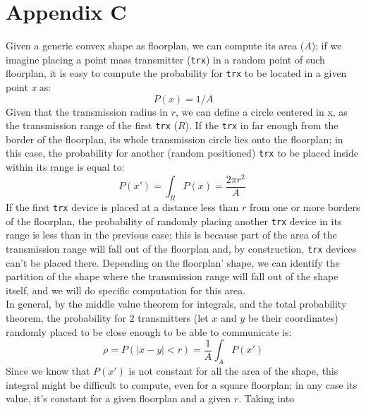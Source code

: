 \section*{Appendix C}
\label{app:c}
Given a generic convex shape as floorplan, we can compute its area ($A$); if we
imagine placing a point mass transmitter (\texttt{trx}) in a random point of
such floorplan, it is easy to compute the probability for \texttt{trx} to be
located in a given point \textit{x} as:
\begin{equation*}
    P(x) = 1/A
\end{equation*}
Given that the transmission radius in $r$, we can define a circle centered in x, 
as the transmission range of the first \texttt{trx} ($R$). If the \texttt{trx}
in far enough from the border of the floorplan, its whole transmission circle lies
onto the floorplan; in this case, the probability for another (random
positioned) \texttt{trx} to be placed inside within its range is equal to:
\begin{equation*}
    P(x') = \int_{R}^{} P(x)= \frac{2\pi r^2}{A} \ 
\end{equation*}
If the first \texttt{trx} device is placed at a distance less than $r$ from one
or more borders of the floorplan, the probability of randomly placing another
\texttt{trx} device in its range is less than in the previous case; this is
because part of the area of the transmission range will fall out of the
floorplan and, by construction, \texttt{trx} devices can't be placed there. 
Depending on the floorplan' shape, we can identify the partition of the shape
where the transmission range will fall out of the shape itself, and we will do
specific computation for this area.\\
In general, by the middle value theorem for integrals, and the total probability
theorem, the probability for $2$ transmitters (let $x$ and $y$ be their
coordinates) randomly placed to be close enough to be able to communicate is:
\begin{equation*}
    \rho = P(|x-y|<r) = \frac{1}{A} \int_{A}^{} P(x')
\end{equation*}
Since we know that $P(x')$ is not constant for all the area of the shape, this
integral might be difficult to compute, even for a square floorplan; in any case
its value, it's constant for a given floorplan and a given $r$. Taking into
